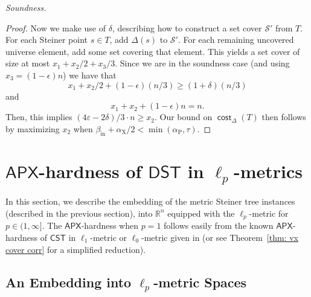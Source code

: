 \documentclass{theoretics}
\DeclareMathOperator{\cost}{\mathsf{cost}}
\newcommand{\R}{\mathbb{R}}
\newcommand{\1}{\textbf{1}}
\newcommand{\cst}{$\mathsf{CST}$\xspace}
\newcommand{\dst}{$\mathsf{DST}$\xspace}
\newcommand{\apx}{$\mathsf{APX}$\xspace}
\newcommand{\td}{\tau}
\newcommand{\srd}{\alpha_{\text{X}}}
\newcommand{\trd}{\alpha_{\text{P}}}
\begin{document}
\begin{paragraph}{\textit{Soundness.}}
\begin{proof}
 Now we make use of $\delta$, describing how to construct a set cover $\mathcal{S}'$ from $T$. For each Steiner point $s \in T$, add $\Delta(s)$ to $\mathcal{S}'$. For each remaining uncovered universe element, add some set covering that element. This yields a set cover of size at most $x_1 + x_2/2 + x_3/3$. Since we are in the soundness case (and using $x_3 = (1-\epsilon)n$) we have that
 \[
 x_1 + x_2/2 + (1-\epsilon)(n/3) \geq (1+\delta)(n/3)
 \]
 and 
\[
x_1 + x_2 + (1-\epsilon)n = n.
\]
Then, this implies $(4\varepsilon  - 2\delta)/3 \cdot n \geq x_2$. Our bound on $\cost_{\Delta}(T)$ then follows by maximizing $x_2$ when $\beta_{\text{in}} + \srd/2 < \min(\trd, \td)$.
 \end{proof}
 \end{paragraph}
 


\section{\texorpdfstring{\apx}{APX}-hardness of  \texorpdfstring{\dst}{DST} in \texorpdfstring{$\ell_p$}{lp}-metrics} \label{sec: l_p}


In this section, we describe the embedding of the metric Steiner tree instances (described in the previous section), into $\R^n$ equipped with the $\ell_p$-metric for $p \in (1, \infty]$. The \apx-hardness when $p = 1$ follows easily from the known \apx-hardness of  \cst in $\ell_1$-metric or $\ell_0$-metric given in  \cite{Trevisan00} (or see Theorem~\ref{thm: vx cover corr} for a simplified reduction). 

\subsection{An Embedding into \texorpdfstring{$\ell_p$}{lp}-metric Spaces} \label{subsec: ell_p embedding}
 
\end{document}
